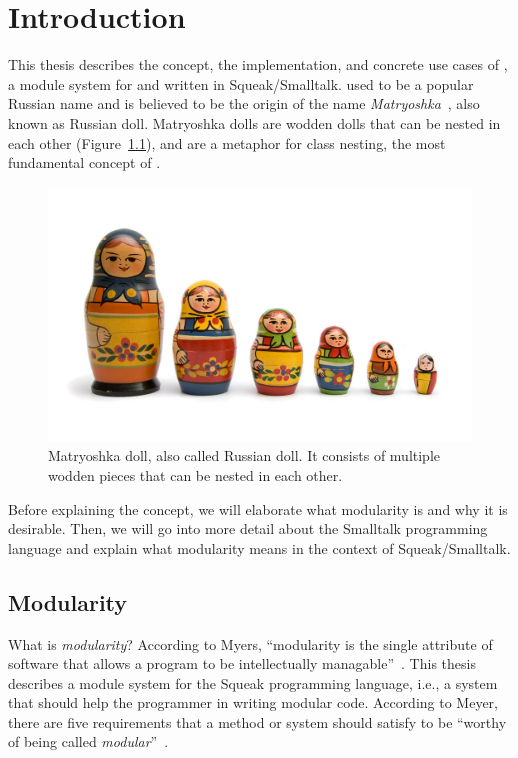 \chapter{Introduction}
This thesis describes the concept, the implementation, and concrete use cases of \emph{\msname}, a module system for and written in Squeak/Smalltalk. \msname used to be a popular Russian name and is believed to be the origin of the name \emph{Matryoshka}~\cite{dixon1998encyclopedia}, also known as Russian doll. Matryoshka dolls are wodden dolls that can be nested in each other (Figure~\ref{fig:matryoshka}), and are a metaphor for class nesting, the most fundamental concept of \msname.

\begin{figure}[!htp]
	\includegraphics[width=\textwidth]{matryoshka.jpg}
	\caption[Matryoshka doll]{Matryoshka doll, also called Russian doll. It consists of multiple wodden pieces that can be nested in each other.}
	\label{fig:matryoshka}
\end{figure}

Before explaining the concept, we will elaborate what modularity is and why it is desirable. Then, we will go into more detail about the Smalltalk programming language and explain what modularity means in the context of Squeak/Smalltalk.

\section{Modularity}
What is \emph{modularity}? According to Myers, ``modularity is the single attribute of software that allows a program to be intellectually managable''~\cite{myers1978composite}. This thesis describes a module system for the Squeak programming language, i.e., a system that should help the programmer in writing modular code. According to Meyer, there are five requirements that a method or system should satisfy to be ``worthy of being called \emph{modular}''~\cite{Meyer:1988:OSC:534929}.

